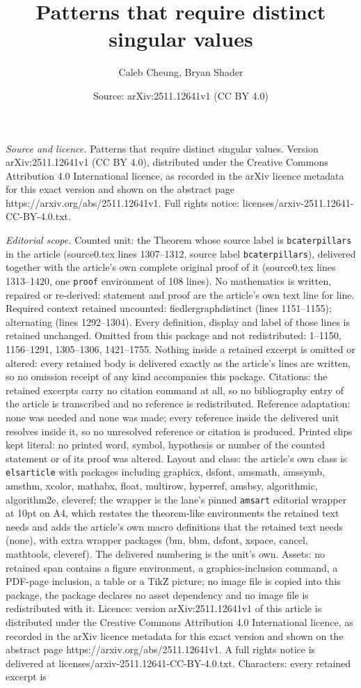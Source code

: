 \documentclass[10pt,a4paper]{amsart}
\title[Patterns that require distinct singular values]{Patterns that require distinct singular values}
\author{Caleb Cheung, Bryan Shader}
\date{Source: arXiv:2511.12641v1 (CC BY 4.0)}
\begin{document}
\maketitle

\noindent\emph{Source and licence.} Patterns that require distinct singular values. Version arXiv:2511.12641v1 (CC BY 4.0), distributed under the Creative Commons Attribution 4.0 International licence, as recorded in the arXiv licence metadata for this exact version and shown on the abstract page https://arxiv.org/abs/2511.12641v1. Full rights notice: licenses/arxiv-2511.12641-CC-BY-4.0.txt.\par\smallskip

\noindent\textit{Editorial scope.} Counted unit: the Theorem whose source label is \texttt{bcaterpillars} in the article (source0.tex lines 1307--1312, source label \texttt{bcaterpillars}), delivered together with the article's own complete original proof of it (source0.tex lines 1313--1420, one \texttt{proof} environment of 108 lines). No mathematics is written, repaired or re-derived: statement and proof are the article's own text line for line. Required context retained uncounted: fiedlergraphdistinct (lines 1151--1155); alternating (lines 1292--1304). Every definition, display and label of those lines is retained unchanged. Omitted from this package and not redistributed: 1--1150, 1156--1291, 1305--1306, 1421--1755. Nothing inside a retained excerpt is omitted or altered: every retained body is delivered exactly as the article's lines are written, so no omission receipt of any kind accompanies this package. Citations: the retained excerpts carry no citation command at all, so no bibliography entry of the article is transcribed and no reference is redistributed. Reference adaptation: none was needed and none was made; every reference inside the delivered unit resolves inside it, so no unresolved reference or citation is produced. Printed slips kept literal: no printed word, symbol, hypothesis or number of the counted statement or of its proof was altered. Layout and class: the article's own class is \texttt{elsarticle} with packages including graphicx, dsfont, amsmath, amssymb, amsthm, xcolor, mathabx, float, multirow, hyperref, amsbsy, algorithmic, algorithm2e, cleveref; the wrapper is the lane's pinned \texttt{amsart} editorial wrapper at 10pt on A4, which restates the theorem-like environments the retained text needs and adds the article's own macro definitions that the retained text needs (none), with extra wrapper packages (bm, bbm, dsfont, xspace, cancel, mathtools, cleveref). The delivered numbering is the unit's own. Assets: no retained span contains a figure environment, a graphics-inclusion command, a PDF-page inclusion, a table or a TikZ picture; no image file is copied into this package, the package declares no asset dependency and no image file is redistributed with it. Licence: version arXiv:2511.12641v1 of this article is distributed under the Creative Commons Attribution 4.0 International licence, as recorded in the arXiv licence metadata for this exact version and shown on the abstract page https://arxiv.org/abs/2511.12641v1. A full rights notice is delivered at licenses/arxiv-2511.12641-CC-BY-4.0.txt. Characters: every retained excerpt is 
\end{document}
